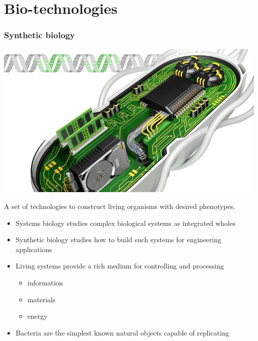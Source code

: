 \documentclass{beamer}
\begin{document}
\section{Bio-technologies}
\begin{frame}
	\frametitle{Synthetic biology}
	\begin{center}
		\includegraphics[scale=.4]{SynBio_main}
	\end{center}
	A set of technologies to construct living organisms with desired phenotypes. 
\end{frame}
\begin{frame}
		\begin{itemize}
		\item Systems biology studies complex biological systems as integrated wholes
		\item Synthetic biology studies how to build such systems for engineering applications
		\item Living systems provide a rich medium for controlling and processing
			\begin{itemize}
				\item information
				\item materials
				\item energy
			\end{itemize}
		\item Bacteria are the simplest known natural objects capable of replicating
	\end{itemize}
\end{frame}
\end{document}
